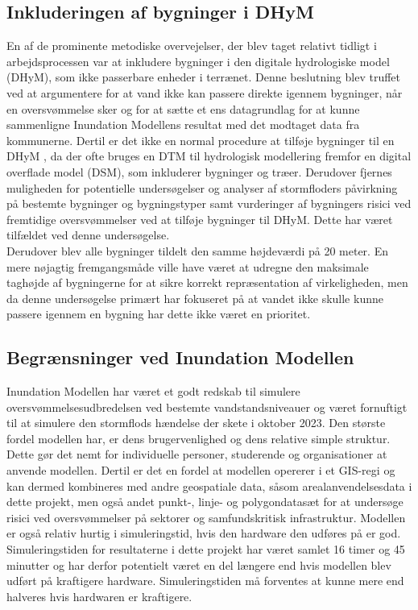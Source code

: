 \subsection{Inkluderingen af bygninger i DHyM}
En af de prominente metodiske overvejelser, der blev taget relativt tidligt i arbejdsprocessen var at inkludere bygninger i den digitale hydrologiske model (DHyM), som ikke passerbare enheder i terrænet. Denne beslutning blev truffet ved at argumentere for at vand ikke kan passere direkte igennem bygninger, når en oversvømmelse sker og for at sætte et ens datagrundlag for at kunne sammenligne Inundation Modellens resultat med det modtaget data fra kommunerne. Dertil er det ikke en normal procedure at tilføje bygninger til en DHyM \citep{khosh_bin_ghomash_technical_2024}, da der ofte bruges en DTM til hydrologisk modellering fremfor en digital overflade model (DSM), som inkluderer bygninger og træer. Derudover fjernes muligheden for potentielle undersøgelser og analyser af stormfloders påvirkning på bestemte bygninger og bygningstyper samt vurderinger af bygningers risici ved fremtidige oversvømmelser ved at tilføje bygninger til DHyM. Dette har været tilfældet ved denne undersøgelse. \\
Derudover blev alle bygninger tildelt den samme højdeværdi på 20 meter. En mere nøjagtig fremgangsmåde ville have været at udregne den maksimale taghøjde af bygningerne for at sikre korrekt repræsentation af virkeligheden, men da denne undersøgelse primært har fokuseret på at vandet ikke skulle kunne passere igennem en bygning har dette ikke været en prioritet. \\


\subsection{Begrænsninger ved Inundation Modellen}
Inundation Modellen har været et godt redskab til simulere oversvømmelsesudbredelsen ved bestemte vandstandsniveauer og været fornuftigt til at simulere den stormflods hændelse der skete i oktober 2023. 
Den største fordel modellen har, er dens brugervenlighed og dens relative simple struktur. Dette gør det nemt for individuelle personer, studerende og organisationer at anvende modellen. Dertil er det en fordel at modellen opererer i et GIS-regi og kan dermed kombineres med andre geospatiale data, såsom arealanvendelsesdata i dette projekt, men også andet punkt-, linje- og polygondatasæt for at undersøge risici ved oversvømmelser på sektorer og samfundskritisk infrastruktur. Modellen er også relativ hurtig i simuleringstid, hvis den hardware den udføres på er god. Simuleringstiden for resultaterne i dette projekt har været samlet 16 timer og 45 minutter og har derfor potentielt været en del længere end hvis modellen blev udført på kraftigere hardware. Simuleringstiden må forventes at kunne mere end halveres hvis hardwaren er kraftigere.\\

